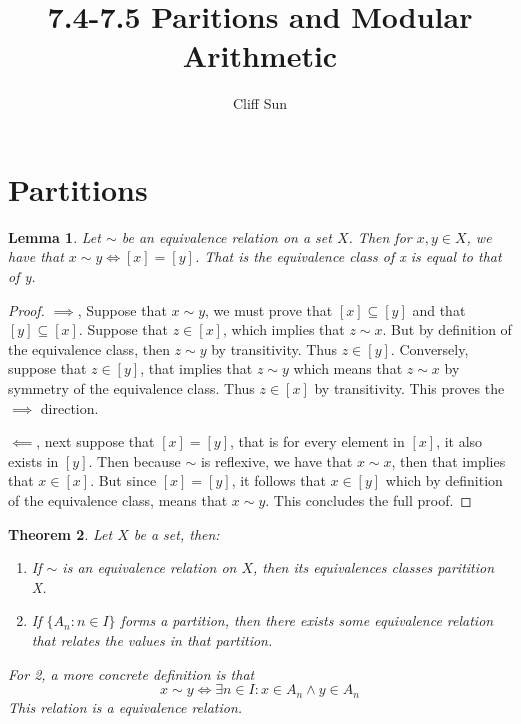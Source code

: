 \documentclass{article}
\title{7.4-7.5 Paritions and Modular Arithmetic}
\author{Cliff Sun}
\newtheorem{theorem}{Theorem}[section]
\newtheorem{lemma}[theorem]{Lemma}
\begin{document}
\maketitle

\section*{Partitions}

\begin{lemma}
    Let $\sim$ be an equivalence relation on a set $X$. Then for $x,y \in X$, we have that 
    $x \sim y \iff [x] = [y]$. That is the equivalence class of x is equal to that of y. 
\end{lemma}

\begin{proof}
    $\implies$, Suppose that $x \sim y$, we must prove that $[x] \subseteq [y]$ and that $[y] \subseteq [x]$. Suppose that $z \in [x]$, which implies that 
    $z \sim x$. But by definition of the equivalence class, then $z \sim y$ by transitivity. Thus $z \in [y]$. Conversely, suppose that $z \in [y]$, that implies that $z \sim y$ which means that $z \sim x$ by symmetry of the equivalence class. Thus $z \in [x]$ by transitivity. 
    This proves the $\implies$ direction. 

    $\impliedby$, next suppose that $[x] = [y]$, that is for every element in $[x]$, it also exists in $[y]$. Then because $\sim$ is reflexive, we have that $x \sim x$, then that implies that 
    $x \in [x]$. But since $[x] = [y]$, it follows that $x \in [y]$ which by definition of the equivalence class, means that $x \sim y$. This concludes the full proof. 
\end{proof}

\begin{theorem}
    Let $X$ be a set, then:
    \begin{enumerate}
        \item If $\sim$ is an equivalence relation on $X$, then its equivalences classes paritition X. 
        \item If $\{A_n: n \in I\}$ forms a partition, then there exists some equivalence relation that relates the values in that partition.
    \end{enumerate}
    For 2, a more concrete definition is that 
    \begin{equation}
        x \sim y \iff \exists n \in I : x \in A_n \land y \in A_n
    \end{equation}
    This relation is a equivalence relation. 
\end{theorem}
\end{document}
